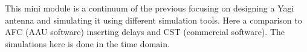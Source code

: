 This mini module is a continuum of the previous focusing on designing a Yagi antenna and simulating it using different simulation tools. Here a comparison to AFC (AAU software) inserting delays and CST (commercial software). The simulations here is done in the time domain. 